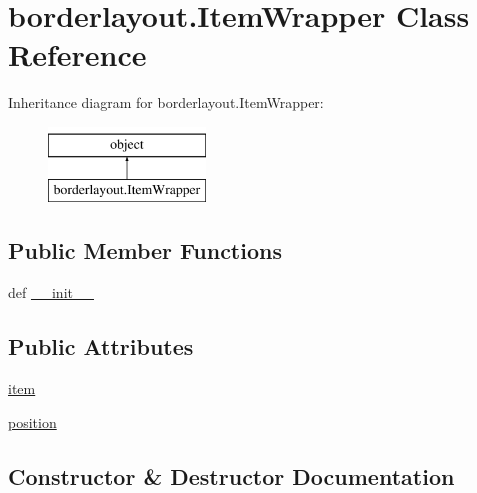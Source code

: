 \hypertarget{classborderlayout_1_1ItemWrapper}{}\section{borderlayout.\+Item\+Wrapper Class Reference}
\label{classborderlayout_1_1ItemWrapper}
Inheritance diagram for borderlayout.\+Item\+Wrapper\+:\begin{figure}[H]
\begin{center}
\leavevmode
\includegraphics[height=2.000000cm]{classborderlayout_1_1ItemWrapper}
\end{center}
\end{figure}
\subsection*{Public Member Functions}
\begin{DoxyCompactItemize}
\item 
def \hyperlink{classborderlayout_1_1ItemWrapper_a40278e8e92f41adc456c363650d50066}{\+\_\+\+\_\+init\+\_\+\+\_\+}
\end{DoxyCompactItemize}
\subsection*{Public Attributes}
\begin{DoxyCompactItemize}
\item 
\hyperlink{classborderlayout_1_1ItemWrapper_a2b18174d4e6c7eec6536b9a4dc0dd7f2}{item}
\item 
\hyperlink{classborderlayout_1_1ItemWrapper_aee2d16466a65faeb07976ff552967eab}{position}
\end{DoxyCompactItemize}


\subsection{Constructor \& Destructor Documentation}
\hypertarget{classborderlayout_1_1ItemWrapper_a40278e8e92f41adc456c363650d50066}{}
